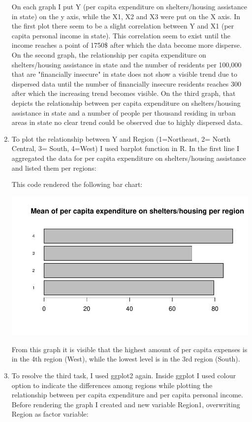 \documentclass[12pt,letterpaper]{article}
\begin{document}
\begin{enumerate}
	On each graph I put Y (per capita expenditure on shelters/housing assistance in state) on the y axis, while the X1, X2 and X3 were put on the X axis. In the first plot there seem to be a slight correlation between Y and X1 (per capita personal income in state). This correlation seem to exist until the income reaches a point of 1750\$ after which the data become more disperse. On the second graph, the relationship per capita expenditure on shelters/housing assistance in state and the number of residents per 100,000 that are "financially insecure" in state does not show a visible trend due to dispersed data until the number of financially insecure residents reaches 300 after which the increasing trend becomes visible. On the third graph, that depicts the relationship between per capita expenditure on shelters/housing assistance in state and a number of people per thousand residing in urban areas in state no clear trend could be observed due to highly dispersed data. 
	
	\item To plot the relationship between Y and Region (1=Northeast, 2= North Central, 3= South, 4=West) I used barplot function in R. In the first line I aggregated the data for per capita expenditure on shelters/housing assistance and listed them per regions:   
	 
	
	
	This code rendered the following bar chart:
	
	\includegraphics{Barplot}
	
	From this graph it is visible that the highest amount of per capita expenses is in the 4th region (West), while the lowest level is in the 3rd region (South).  
	
	\item To resolve the third task, I used ggplot2 again. Inside ggplot I used colour option to indicate the differences among regions while plotting the relationship between per capita expenditure and per capita personal income. Before rendering the graph I created and new variable Region1, overwriting Region as factor variable: 
	

\end{enumerate}
\end{document}
